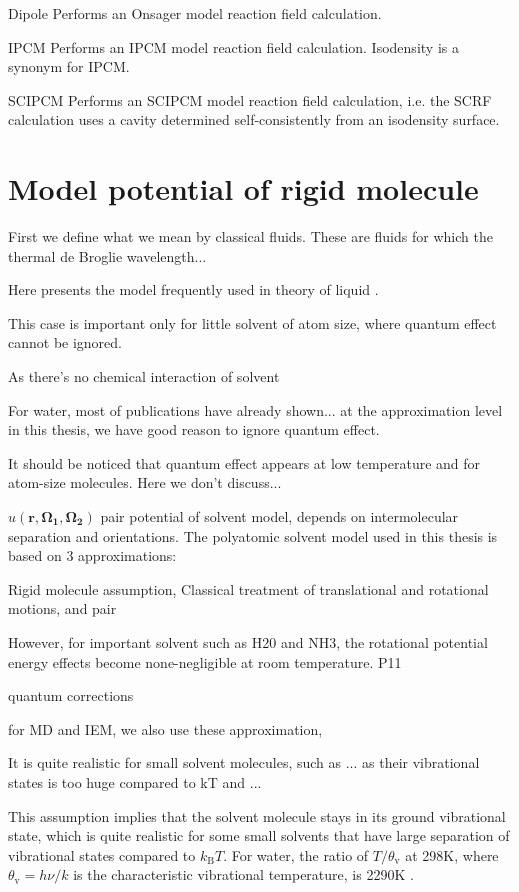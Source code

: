 Dipole Performs an Onsager model reaction field calculation.

IPCM Performs an IPCM model reaction field calculation. Isodensity
is a synonym for IPCM.

SCIPCM Performs an SCIPCM model reaction field calculation, i.e. the
SCRF calculation uses a cavity determined self-consistently from an
isodensity surface.


\section{Model potential of rigid molecule}

First we define what we mean by classical fluids. These are fluids
for which the thermal de Broglie wavelength...

Here presents the model frequently used in theory of liquid \citep{Hensen-McDonald,Gray-Gubbins}.

This case is important only for little solvent of atom size, where
quantum effect cannot be ignored.

As there's no chemical interaction of solvent

For water, most of publications have already shown... at the approximation
level in this thesis, we have good reason to ignore quantum effect.

It should be noticed that quantum effect appears at low temperature
and for atom-size molecules. Here we don't discuss...

$u(\mathbf{r},\mathbf{\Omega_{1}},\mathbf{\Omega_{2}})$ pair potential
of solvent model, depends on intermolecular separation and orientations.
The polyatomic solvent model used in this thesis is based on 3 approximations:

Rigid molecule assumption, Classical treatment of translational and
rotational motions, and pair

However, for important solvent such as H20 and NH3, the rotational
potential energy effects become none-negligible at room temperature.
P11

quantum corrections 

for MD and IEM, we also use these approximation, 

It is quite realistic for small solvent molecules, such as ... as
their vibrational states is too huge compared to kT and ...

This assumption implies that the solvent molecule stays in its ground
vibrational state, which is quite realistic for some small solvents
that have large separation of vibrational states compared to $k_{\mathrm{B}}T$.
For water, the ratio of $T/\theta_{\mathrm{v}}$ at 298K, where $\theta_{\mathrm{v}}=h\nu/k$
is the characteristic vibrational temperature, is 2290K \citep{Gray-Gubbins}. 

